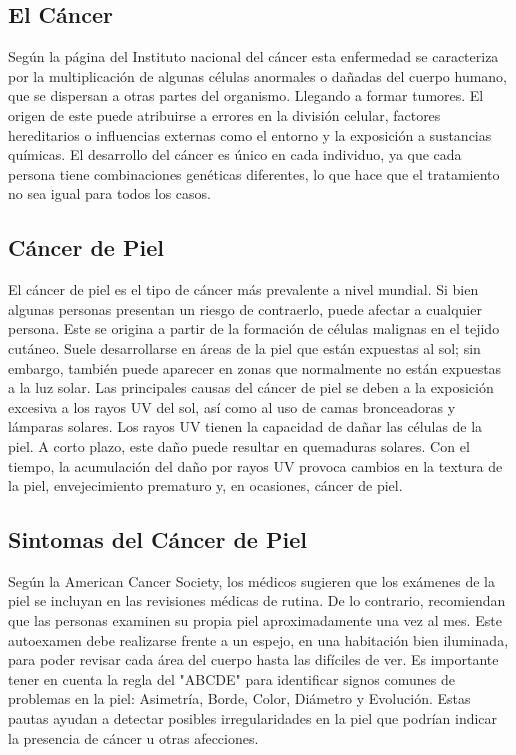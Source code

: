 
\subsection{El Cáncer}
Según la página del Instituto nacional del cáncer esta enfermedad se caracteriza por la multiplicación de algunas células anormales o dañadas del cuerpo humano, que se dispersan a otras partes del organismo. Llegando a formar tumores. \parencite{cáncer_2024 }
El origen de este puede atribuirse a errores en la división celular, factores hereditarios o influencias externas como el entorno y la exposición a sustancias químicas. El desarrollo del cáncer es único en cada individuo, ya que cada persona tiene combinaciones genéticas diferentes, lo que hace que el tratamiento no sea igual para todos los casos.

\subsection{Cáncer de Piel}
El cáncer de piel es el tipo de cáncer más prevalente a nivel mundial. Si bien algunas personas presentan un riesgo de contraerlo, puede afectar a cualquier persona. Este se origina a partir de la formación de células malignas en el tejido cutáneo.
Suele desarrollarse en áreas de la piel que están expuestas al sol; sin embargo, también puede aparecer en zonas que normalmente no están expuestas a la luz solar.
Las principales causas del cáncer de piel se deben a la exposición excesiva a los rayos UV del sol, así como al uso de camas bronceadoras y lámparas solares. Los rayos UV tienen la capacidad de dañar las células de la piel. A corto plazo, este daño puede resultar en quemaduras solares. Con el tiempo, la acumulación del daño por rayos UV provoca cambios en la textura de la piel, envejecimiento prematuro y, en ocasiones, cáncer de piel. \parencite{cáncer_piel_clinic_2024}

\subsection{Sintomas del Cáncer de Piel}
Según la American Cancer Society, los médicos sugieren que los exámenes de la piel se incluyan en las revisiones médicas de rutina. De lo contrario, recomiendan que las personas examinen su propia piel aproximadamente una vez al mes. Este autoexamen debe realizarse frente a un espejo, en una habitación bien iluminada, para poder revisar cada área del cuerpo hasta las difíciles de ver. Es importante tener en cuenta la regla del "ABCDE" para identificar signos comunes de problemas en la piel: Asimetría, Borde, Color, Diámetro y Evolución. Estas pautas ayudan a detectar posibles irregularidades en la piel que podrían indicar la presencia de cáncer u otras afecciones.
\parencite{ information_cancer}

